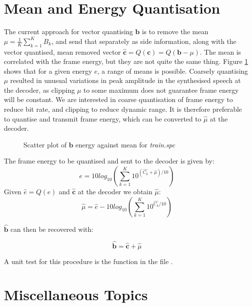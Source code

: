 \documentclass{article}
\begin{document}
\section{Mean and Energy Quantisation}

The current approach for vector quantising $\mathbf{b}$ is to remove the mean $\mu=\frac{1}{K} \sum_{k=1}^K B_k$, and send that separately as side information, along with the vector quantised, mean removed vector $\hat{\mathbf{c}}=Q(\mathbf{c})=Q(\mathbf{b}-\mu)$.  The mean is correlated with the frame energy, but they are not quite the same thing.  Figure \ref{fig:train_e_mean} shows that for a given energy $e$, a range of means is possible. Coarsely quantising $\mu$ resulted in unusual variations in peak amplitude in the synthesised speech at the decoder, as clipping $\mu$ to some maximum does not guarantee frame energy will be constant.  We are interested in coarse quantisation of frame energy to reduce bit rate, and clipping to reduce dynamic range.  It is therefore preferable to quantise and transmit frame energy, which can be converted to $\hat{\mu}$ at the decoder.

\begin{figure}[h]
\caption{Scatter plot of $\mathbf{b}$ energy against mean for \emph{train.spc}}
\label{fig:train_e_mean}
\begin{center}

\end{center}
\end{figure}

The frame energy to be quantised and sent to the decoder is given by:
\begin{equation}
e = 10log_{10}\left( \sum_{k=1}^K 10^{ (\hat{C_k}+\hat{\mu})/10 } \right)
\end{equation}
Given $\hat{e}=Q(e)$ and $\hat{\mathbf{c}}$ at the decoder we obtain $\hat{\mu}$:
\begin{equation}
\hat{\mu} = \hat{e} - 10log_{10}\left( \sum_{k=1}^K 10^{\hat{C_k}/10} \right)
\end{equation}

$\hat{\mathbf{b}}$ can then be recovered with:

\begin{equation}
\hat{\mathbf{b}} = \hat{\mathbf{c}} + \hat{\mu}
\end{equation}

A unit test for this procedure is the function  in the file .

\section{Miscellaneous Topics}
\end{document}
